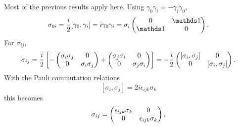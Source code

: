 \documentclass[10pt,letterpaper]{article}
\begin{document}
	Most of the previous results apply here. Using $\gamma_0\gamma_i = -\gamma_i\gamma_0$, 
	\[
		\sigma_{0i} = \frac{i}{2}[\gamma_0,\gamma_i] = i\gamma_0\gamma_i = \sigma_i
		\bpm 0 & \mathds 1 \\ \mathds 1 & 0\epm.
	\]
	For $\sigma_{ij}$, 
	\[
		\sigma_{ij} = \frac{i}{2}\left[ - \begin{pmatrix} \sigma_i\sigma_j & 0\\ 0 & \sigma_i\sigma_j \end{pmatrix}
		+
		 \begin{pmatrix} \sigma_j\sigma_i & 0\\ 0 & \sigma_j\sigma_i \end{pmatrix}\right]
		 = -\frac{i}{2}\begin{pmatrix} [\sigma_i,\sigma_j] &0 \\ 0 & [\sigma_i,\sigma_j] \end{pmatrix}. 
	\]
	With the Pauli commutation relations
	\[
		[\sigma_i,\sigma_j] = 2i\epsilon_{ijk}\sigma_k
	\]
	this becomes
	\[
		\sigma_{ij} = \begin{pmatrix} \epsilon_{ijk}\sigma_k & 0 \\ 0 & \epsilon_{ijk} \sigma_k \end{pmatrix}.
	\]
	
\end{document}
